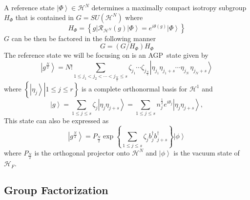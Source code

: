 \documentclass[aps,preprint]{revtex4}%
\begin{document}
A reference state $\left\vert \Phi\right\rangle \in\mathcal{H}^{N}$ determines
a maximally compact isotropy subgroup $H_{\Phi}$ that is contained in
$G=SU\left(  \mathcal{H}^{N}\right)  $ where
\begin{equation}
H_{\Phi}=\left\{  \left.  g\right\vert \mathcal{R}_{\mathcal{H}^{N}}\left(
g\right)  \left\vert \Phi\right\rangle =e^{i\theta\left(  g\right)
}\left\vert \Phi\right\rangle \right\}
\end{equation}
$G$ can be then be factored in the following manner%
\begin{equation}
G=\left(  G/H_{\Phi}\right)  H_{\Phi}%
\end{equation}
The reference state we will be focusing on is an AGP\ state given by
\begin{equation}
\left\vert g^{\frac{N}{2}}\right\rangle =N!\sum_{1\leq j_{1}<j_{2}%
<\cdots<j_{\frac{N}{2}}\leq s}\zeta_{j_{1}}\cdots\zeta_{j_{\frac{N}{2}}%
}\left\vert \eta_{j_{1}}\eta_{j_{1}+s}\cdots\eta_{j_{N}\,}\eta_{j_{N}%
+s}\right\rangle \label{canexp}%
\end{equation}
where $\left\{  \left.  \left\vert \eta_{j}\right\rangle \right\vert 1\leq
j\leq r\right\}  $ is a complete orthonormal basis for $\mathcal{H}^{1}$ and
\begin{equation}
\left\vert g\right\rangle =\sum_{1\leq j\leq s}\zeta_{j}\left\vert \eta
_{j}\eta_{j+s}\right\rangle =\sum_{1\leq j\leq s}n_{j}^{\frac{1}{2}}%
e^{i\theta_{j}}\left\vert \eta_{j}\eta_{j+s}\right\rangle ,
\end{equation}
This state can also be expressed as
\begin{equation}
\left\vert g^{\frac{N}{2}}\right\rangle =P_{\frac{N}{2}}\exp\left\{
\sum_{1\leq j\leq s}\zeta_{j}b_{j}^{\dagger}b_{j+s}^{\dagger}\right\}
\left\vert \phi\right\rangle
\end{equation}
where $P_{\frac{N}{2}}$ is the orthogonal projector onto $\mathcal{H}^{N}$ and
$\left\vert \phi\right\rangle $ is the vacuum state of $\mathcal{H}_{F}$.

\subsection{Group Factorization\label{factor}}
\end{document}

